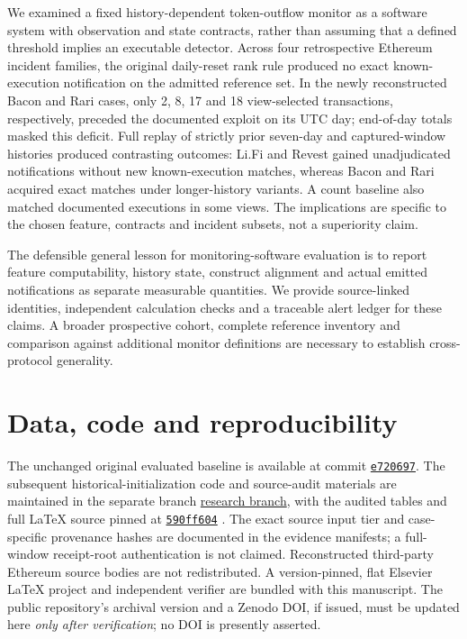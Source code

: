 \documentclass[preprint,12pt,authoryear]{elsarticle}
\begin{document}
We examined a fixed history-dependent token-outflow monitor as a software system with observation and state contracts, rather than assuming that a defined threshold implies an executable detector. Across four retrospective Ethereum incident families, the original daily-reset rank rule produced no exact known-execution notification on the admitted reference set. In the newly reconstructed Bacon and Rari cases, only 2, 8, 17 and 18 view-selected transactions, respectively, preceded the documented exploit on its UTC day; end-of-day totals masked this deficit. Full replay of strictly prior seven-day and captured-window histories produced contrasting outcomes: Li.Fi and Revest gained unadjudicated notifications without new known-execution matches, whereas Bacon and Rari acquired exact matches under longer-history variants. A count baseline also matched documented executions in some views. The implications are specific to the chosen feature, contracts and incident subsets, not a superiority claim.

The defensible general lesson for monitoring-software evaluation is to report feature computability, history state, construct alignment and actual emitted notifications as separate measurable quantities. We provide source-linked identities, independent calculation checks and a traceable alert ledger for these claims. A broader prospective cohort, complete reference inventory and comparison against additional monitor definitions are necessary to establish cross-protocol generality.

\section*{Data, code and reproducibility}
The unchanged original evaluated baseline is available at commit
\href{https://github.com/KuznetsovKarazin/blockchain-analytics-lab/commit/e720697bc3986dd291a7047c580cf973ae6e5567}{\texttt{e720697}}. The subsequent historical-initialization code and source-audit materials are maintained in the separate branch
\href{https://github.com/KuznetsovKarazin/blockchain-analytics-lab/tree/research/monitoring-applicability-20261029}{research branch}, with the audited tables and full LaTeX source pinned at \href{https://github.com/KuznetsovKarazin/blockchain-analytics-lab/commit/590ff604acfea2f07b31c5a6c259fa61e81263ef}{\texttt{590ff604}} \citep{Kuznetsov2026Artifacts}.
The exact source input tier and case-specific provenance hashes are documented in the evidence manifests; a full-window receipt-root authentication is not claimed. Reconstructed third-party Ethereum source bodies are not redistributed. A version-pinned, flat Elsevier LaTeX project and independent verifier are bundled with this manuscript. The public repository's archival version and a Zenodo DOI, if issued, must be updated here \emph{only after verification}; no DOI is presently asserted.
\end{document}
